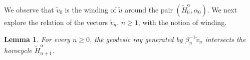 \documentclass[a4paper,english,reqno]{amsart}
\newcommand{\R}{\mathbb{R}}
\newcommand{\N}{\mathbb{N}} %
\newtheorem{lemma}{Lemma}
\newtheorem{property}{Property} %
\theoremstyle{definition}
\numberwithin{equation}{section}
\begin{document}



We observe that $\tilde v_0$ is the winding of $\tilde u$ around the pair $(\tilde H^{\alpha}_0, \alpha_0)$. We next explore the relation of the vectors $\tilde v_n$, $n\ge 1$, with the notion of winding.

\begin{lemma}
	For every $n\ge 0$, the geodesic ray generated by $\beta_n^{-1} \tilde v_n$ intersects the horocycle $\tilde H_{n+1}^{\alpha}$.
\end{lemma}
\end{document}
